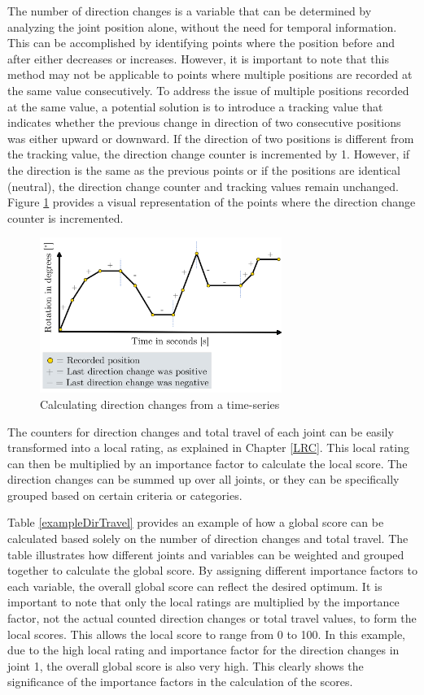 The number of direction changes is a variable that can be determined by analyzing the joint position alone, without the need for temporal information. This can be accomplished by identifying points where the position before and after either decreases or increases. However, it is important to note that this method may not be applicable to points where multiple positions are recorded at the same value consecutively. To address the issue of multiple positions recorded at the same value, a potential solution is to introduce a tracking value that indicates whether the previous change in direction of two consecutive positions was either upward or downward. If the direction of two positions is different from the tracking value, the direction change counter is incremented by 1. However, if the direction is the same as the previous points or if the positions are identical (neutral), the direction change counter and tracking values remain unchanged. Figure \ref{dirchange} provides a visual representation of the points where the direction change counter is incremented.


\begin{figure}[H]
\centerline{\includegraphics[width=0.7\textwidth]{figures/dirchange.png}}
	\caption{Calculating direction changes from a time-series}
	\label{dirchange}
\end{figure}

The counters for direction changes and total travel of each joint can be easily transformed into a local rating, as explained in Chapter \ref{LRC}. This local rating can then be multiplied by an importance factor to calculate the local score. The direction changes can be summed up over all joints, or they can be specifically grouped based on certain criteria or categories.  

Table \ref{exampleDirTravel} provides an example of how a global score can be calculated based solely on the number of direction changes and total travel. The table illustrates how different joints and variables can be weighted and grouped together to calculate the global score. By assigning different importance factors to each variable, the overall global score can reflect the desired optimum. It is important to note that only the local ratings are multiplied by the importance factor, not the actual counted direction changes or total travel values, to form the local scores. This allows the local score to range from 0 to 100. In this example, due to the high local rating and importance factor for the direction changes in joint 1, the overall global score is also very high. This clearly shows the significance of the importance factors in the calculation of the scores.
\newpage

